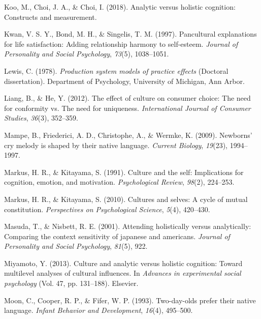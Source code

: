 \documentclass[10pt, letterpaper]{article}
\newenvironment{CSLReferences}%
  {}%
  {\par}
\begin{document}
\begin{CSLReferences}{1}{0}
\leavevmode{}%
Koo, M., Choi, J. A., \& Choi, I. (2018). Analytic versus holistic
cognition: Constructs and measurement.

\leavevmode{}%
Kwan, V. S. Y., Bond, M. H., \& Singelis, T. M. (1997). Pancultural
explanations for life satisfaction: Adding relationship harmony to
self-esteem. \emph{Journal of Personality and Social Psychology},
\emph{73}(5), 1038--1051.

\leavevmode{}%
Lewis, C. (1978). \emph{Production system models of practice effects}
(Doctoral dissertation). Department of Psychology, University of
Michigan, Ann Arbor.

\leavevmode{}%
Liang, B., \& He, Y. (2012). The effect of culture on consumer choice:
The need for conformity vs. The need for uniqueness. \emph{International
Journal of Consumer Studies}, \emph{36}(3), 352--359.

\leavevmode{}%
Mampe, B., Friederici, A. D., Christophe, A., \& Wermke, K. (2009).
Newborns' cry melody is shaped by their native language. \emph{Current
Biology}, \emph{19}(23), 1994--1997.

\leavevmode{}%
Markus, H. R., \& Kitayama, S. (1991). Culture and the self:
Implications for cognition, emotion, and motivation. \emph{Psychological
Review}, \emph{98}(2), 224--253.

\leavevmode{}%
Markus, H. R., \& Kitayama, S. (2010). Cultures and selves: A cycle of
mutual constitution. \emph{Perspectives on Psychological Science},
\emph{5}(4), 420--430.

\leavevmode{}%
Masuda, T., \& Nisbett, R. E. (2001). Attending holistically versus
analytically: Comparing the context sensitivity of japanese and
americans. \emph{Journal of Personality and Social Psychology},
\emph{81}(5), 922.

\leavevmode{}%
Miyamoto, Y. (2013). Culture and analytic versus holistic cognition:
Toward multilevel analyses of cultural influences. In \emph{Advances in
experimental social psychology} (Vol. 47, pp. 131--188). Elsevier.

\leavevmode{}%
Moon, C., Cooper, R. P., \& Fifer, W. P. (1993). Two-day-olds prefer
their native language. \emph{Infant Behavior and Development},
\emph{16}(4), 495--500.


\end{CSLReferences}
\end{document}
